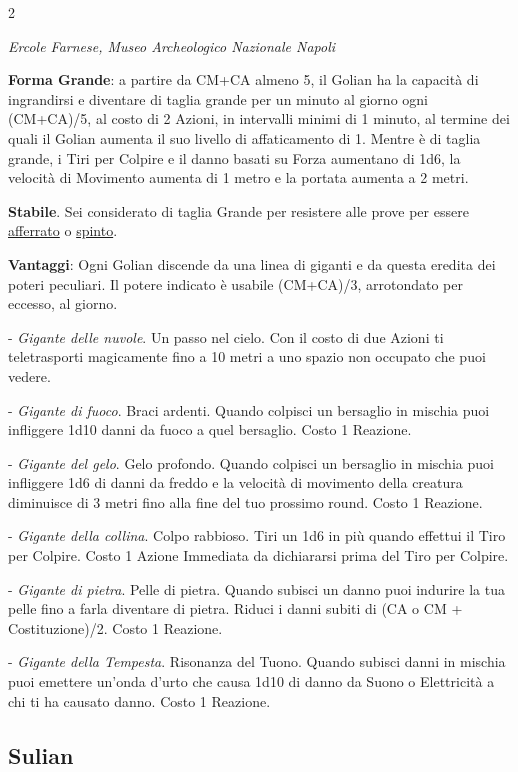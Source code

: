 \begin{multicols}{2}
\begin{center}
	\medskip

	\emph{Ercole Farnese, Museo Archeologico Nazionale Napoli}

\end{center}

\textbf{Forma Grande}: a partire da CM+CA almeno 5, il Golian ha la capacità di ingrandirsi e diventare di taglia grande per un minuto al giorno ogni (CM+CA)/5, al costo di 2 Azioni, in intervalli minimi di 1 minuto, al termine dei quali il Golian aumenta il suo livello di affaticamento di 1. Mentre è di taglia grande, i Tiri per Colpire e il danno basati su Forza aumentano di 1d6, la velocità di Movimento aumenta di 1 metro e la portata aumenta a 2 metri.

\textbf{Stabile}. Sei considerato di taglia Grande per resistere alle prove per essere \hyperlink{spingereavversario}{afferrato} o \hyperlink{spingereavversario}{spinto}.

\textbf{Vantaggi}: Ogni Golian discende da una linea di giganti e da questa eredita dei poteri peculiari. Il potere indicato è usabile (CM+CA)/3, arrotondato per eccesso, al giorno.

- \emph{Gigante delle nuvole}. Un passo nel cielo. Con il costo di due Azioni ti teletrasporti magicamente fino a 10 metri a uno spazio non occupato che puoi vedere.

- \emph{Gigante di fuoco}. Braci ardenti. Quando colpisci un bersaglio in mischia puoi infliggere 1d10 danni da fuoco a quel bersaglio. Costo 1 Reazione.

- \emph{Gigante del gelo}. Gelo profondo. Quando colpisci un bersaglio in mischia puoi infliggere 1d6 di danni da freddo e la velocità di movimento della creatura diminuisce di 3 metri fino alla fine del tuo prossimo round. Costo 1 Reazione.

- \emph{Gigante della collina}. Colpo rabbioso. Tiri un 1d6 in più quando effettui il Tiro per Colpire. Costo 1 Azione Immediata da dichiararsi prima del Tiro per Colpire.

- \emph{Gigante di pietra}. Pelle di pietra. Quando subisci un danno puoi indurire la tua pelle fino a farla diventare di pietra. Riduci i danni subiti di (CA o CM + Costituzione)/2. Costo 1 Reazione.

- \emph{Gigante della Tempesta}. Risonanza del Tuono. Quando subisci danni in mischia puoi emettere un'onda d'urto che causa 1d10 di danno da Suono o Elettricità a chi ti ha causato danno. Costo 1 Reazione.

\subsection{Sulian}\label{sulian}\hypertarget{sulian}{}


\end{multicols}
